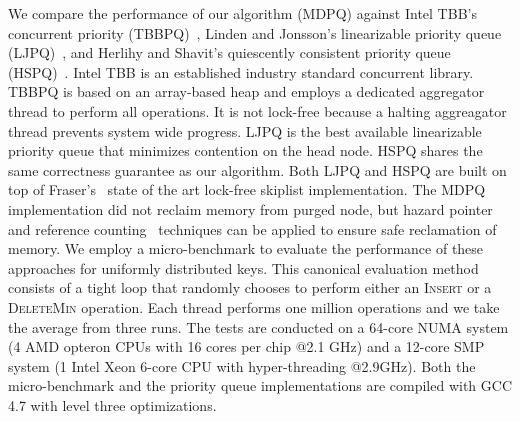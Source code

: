 \documentclass[10pt,journal,letterpaper,compsoc]{IEEEtran}
\begin{document}
We compare the performance of our algorithm (MDPQ) against Intel TBB's concurrent priority (TBBPQ)~\cite{reinders2007intel}, Linden and Jonsson's linearizable priority queue (LJPQ)~\cite{linden2013skiplist}, and Herlihy and Shavit's quiescently consistent priority queue (HSPQ)~\cite{herlihy2012art}.
Intel TBB is an established industry standard concurrent library.
TBBPQ is based on an array-based heap and employs a dedicated aggregator thread to perform all operations.
It is not lock-free because a halting aggreagator thread prevents system wide progress.
LJPQ is the best available linearizable priority queue that minimizes contention on the head node.
HSPQ shares the same correctness guarantee as our algorithm.
Both LJPQ and HSPQ are built on top of Fraser's~\cite{fraser2004practical} state of the art lock-free skiplist implementation.
The MDPQ implementation did not reclaim memory from purged node, but hazard pointer~\cite{michael2004hazard} and reference counting~\cite{gidenstam2009efficient} techniques can be applied to ensure safe reclamation of memory.
We employ a micro-benchmark to evaluate the performance of these approaches for uniformly distributed keys.
This canonical evaluation method~\cite{harris2001pragmatic,shavit2000skiplist,linden2013skiplist,sundell2005fast} consists of a tight loop that randomly chooses to perform either an \textsc{Insert} or a \textsc{DeleteMin} operation. 
Each thread performs one million operations and we take the average from three runs.
The tests are conducted on a 64-core NUMA system (4 AMD opteron CPUs with 16 cores per chip @2.1 GHz) and a 12-core SMP system (1 Intel Xeon 6-core CPU with hyper-threading @2.9GHz). 
Both the micro-benchmark and the priority queue implementations are compiled with GCC 4.7 with level three optimizations.
\end{document}

